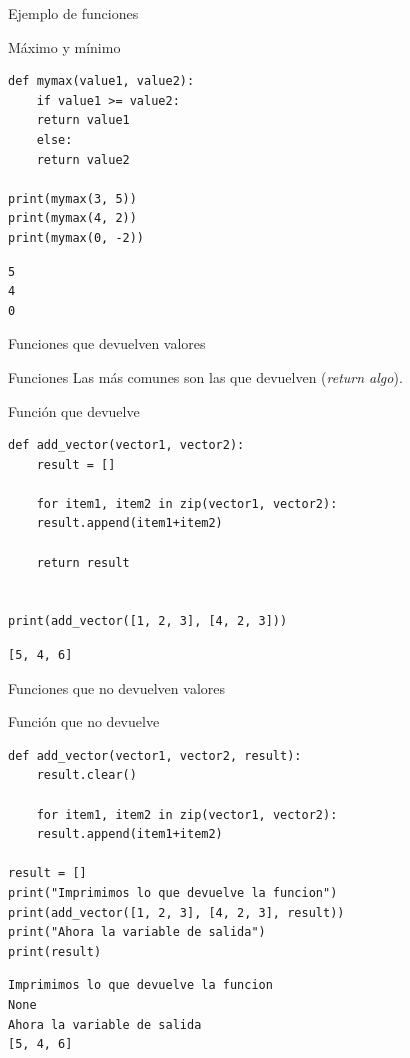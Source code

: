 \documentclass[bigger,unknownkeysallowed]{beamer}
\begin{document}
\begin{frame}[fragile,label={sec:org4271747}]{Ejemplo de funciones}
 \begin{block}{Máximo y mínimo}
\begin{verbatim}
def mymax(value1, value2):
    if value1 >= value2:
	return value1
    else:
	return value2

print(mymax(3, 5))
print(mymax(4, 2))
print(mymax(0, -2))
\end{verbatim}
\scriptsize
\begin{verbatim}
5
4
0
\end{verbatim}
\end{block}
\end{frame}

\begin{frame}[fragile,label={sec:org8438349}]{Funciones que devuelven valores}
 \begin{block}{Funciones}
Las más comunes son las que devuelven (\emph{return algo}). 
\end{block}

\begin{exampleblock}{Función que devuelve}
\begin{verbatim}
def add_vector(vector1, vector2):
    result = []

    for item1, item2 in zip(vector1, vector2):
	result.append(item1+item2)

    return result


print(add_vector([1, 2, 3], [4, 2, 3]))
\end{verbatim}
\scriptsize
\begin{verbatim}
[5, 4, 6]
\end{verbatim}
\end{exampleblock}
\end{frame}

\begin{frame}[fragile,label={sec:org847a425}]{Funciones que no devuelven valores}
 \begin{exampleblock}{Función que no devuelve}
\begin{verbatim}
def add_vector(vector1, vector2, result):
    result.clear()

    for item1, item2 in zip(vector1, vector2):
	result.append(item1+item2)

result = []
print("Imprimimos lo que devuelve la funcion")
print(add_vector([1, 2, 3], [4, 2, 3], result))
print("Ahora la variable de salida")
print(result)
\end{verbatim}
\scriptsize
\begin{verbatim}
Imprimimos lo que devuelve la funcion
None
Ahora la variable de salida
[5, 4, 6]
\end{verbatim}
\end{exampleblock}
\end{frame}
\end{document}
